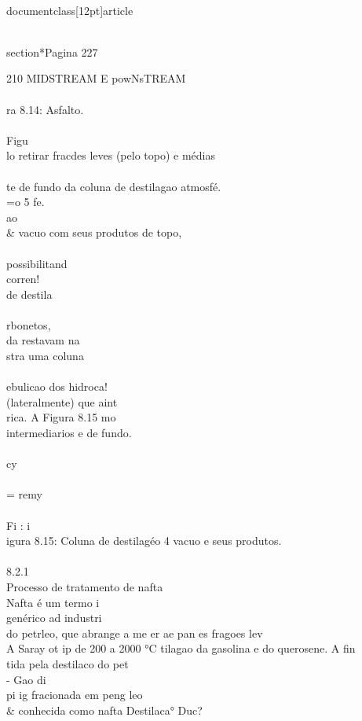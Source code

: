 \\documentclass[12pt]{article}
\begin{document}
{\\section*{Pagina 227}

210 MIDSTREAM E powNsTREAM\\
\\
ra 8.14: Asfalto.\\
\\
Figu\\
lo retirar fracdes leves (pelo topo) e médias\\
\\
te de fundo da coluna de destilagao atmosfé.\\
=o 5 fe.\\
ao \\& vacuo com seus produtos de topo,\\
\\
possibilitand\\
corren!\\
de destila\\
\\
rbonetos,\\
da restavam na\\
stra uma coluna\\
\\
ebulicao dos hidroca!\\
(lateralmente) que aint\\
rica. A Figura 8.15 mo\\
intermediarios e de fundo.\\
\\
cy\\
\\
= remy\\
\\
Fi : i\\
igura 8.15: Coluna de destilagéo 4 vacuo e seus produtos.\\
\\
8.2.1\\
Processo de tratamento de nafta\\
Nafta é um termo i\\
genérico ad industri\\
do petrleo, que abrange a me er ae pan es fragoes lev\\
A Saray ot ip de 200 a 2000 °C tilagao da gasolina e do querosene. A fin\\
tida pela destilaco do pet\\
- Gao di\\
pi ig fracionada em peng leo \\& conhecida como nafta Destilaca° Duc?\\
}
\end{document}
